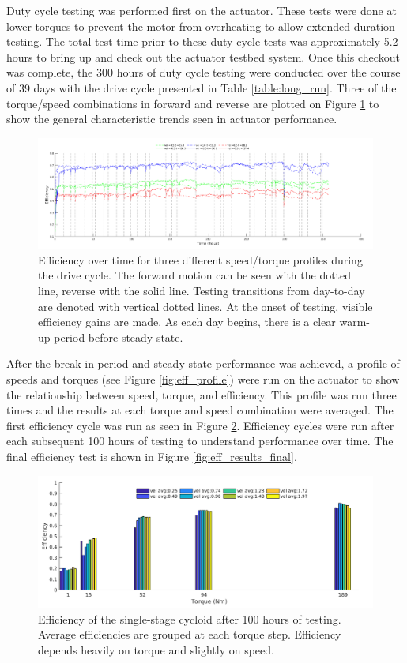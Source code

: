 Duty cycle testing was performed first on the actuator.
These tests were done at lower torques to prevent the motor from overheating to allow extended duration testing.
The total test time prior to these duty cycle tests was approximately 5.2 hours to bring up and check out the actuator testbed system.
Once this checkout was complete, the 300 hours of duty cycle testing were conducted over the course of 39 days with the drive cycle presented in Table \ref{table:long_run}.
Three of the torque/speed combinations in forward and reverse are plotted on Figure \ref{fig:long_run} to show the general characteristic trends seen in actuator performance.

\begin{figure}[!b]
   \centering
   \includegraphics[width=\linewidth]{fig/total_runtime}
   \caption{Efficiency over time for three different speed/torque profiles during the drive cycle.
   The forward motion can be seen with the dotted line, reverse with the solid line.
   Testing transitions from day-to-day are denoted with vertical dotted lines.
   At the onset of testing, visible efficiency gains are made.
   As each day begins, there is a clear warm-up period before steady state.
   }
   \label{fig:long_run}
\end{figure}

After the break-in period and steady state performance was achieved, a profile of speeds and torques (see Figure \ref{fig:eff_profile}) were run on the actuator to show the relationship between speed, torque, and efficiency.
This profile was run three times and the results at each torque and speed combination were averaged. The first efficiency cycle was run as seen in Figure \ref{fig:eff_results}. Efficiency cycles were run after each subsequent 100 hours of testing to understand performance over time. The final efficiency test is shown in Figure \ref{fig:eff_results_final}.

\begin{figure}[t]
   \centering
   \includegraphics[width=0.8\linewidth]{fig/eff_test_bar_plot_v3}
   \caption{Efficiency of the single-stage cycloid after 100 hours of testing. Average efficiencies are grouped at each torque step.
   Efficiency depends heavily on torque and slightly on speed.}
   \label{fig:eff_results}
\end{figure}

